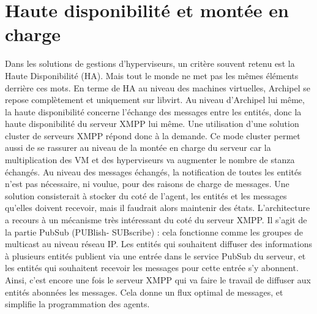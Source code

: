     
    \section{Haute disponibilité et montée en charge}
Dans les solutions de gestions d'hyperviseurs, un critère souvent retenu est la Haute Disponibilité (HA).
Mais tout le monde ne met pas les mêmes éléments derrière ces mots. En terme de HA au niveau des
machines virtuelles, Archipel se repose complètement et uniquement sur libvirt. Au niveau d'Archipel lui
même, la haute disponibilité concerne l'échange des messages entre les entités, donc la haute
disponibilité du serveur XMPP lui même. Une utilisation d'une solution cluster de serveurs XMPP répond
donc à la demande. Ce mode cluster permet aussi de se rassurer au niveau de la montée en charge du
serveur car la multiplication des VM et des hyperviseurs va augmenter le nombre de stanza échangés.\newline
Au niveau des messages échangés, la notification de toutes les entités n'est pas nécessaire, ni voulue,
pour des raisons de charge de messages. Une solution consisterait à stocker du coté de l'agent, les
entités et les messages qu'elles doivent recevoir, mais il faudrait alors maintenir des états. L'architecture
a recours à un mécanisme très intéressant du coté du serveur XMPP. Il s'agit de la partie PubSub (PUBlish-
SUBscribe) : cela fonctionne comme les groupes de multicast au niveau réseau IP. Les entités qui
souhaitent diffuser des informations à plusieurs entités publient via une entrée dans le service PubSub du
serveur, et les entités qui souhaitent recevoir les messages pour cette entrée s'y abonnent. Ainsi, c'est
encore une fois le serveur XMPP qui va faire le travail de diffuser aux entités abonnées les messages. Cela
donne un flux optimal de messages, et simplifie la programmation des agents.\newline

